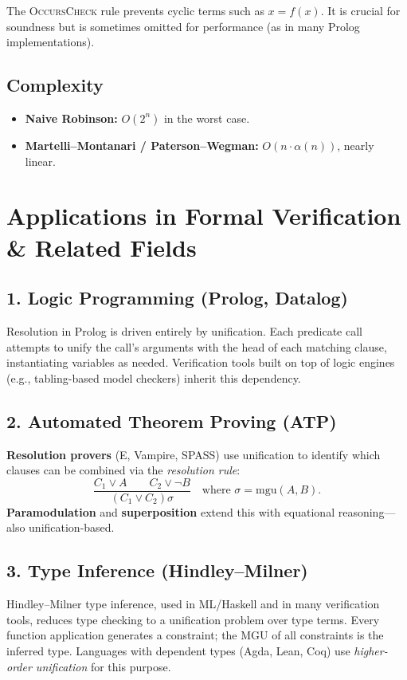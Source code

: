 \documentclass[11pt, a4paper]{article}
\begin{document}
\vspace{0.5em}
\noindent The \textsc{OccursCheck} rule prevents cyclic terms such as $x = f(x)$.
It is crucial for soundness but is sometimes omitted for performance (as in many
Prolog implementations).
 
\subsection{Complexity}
 
\begin{itemize}[leftmargin=*, itemsep=3pt]
    \item \textbf{Naive Robinson:} $O(2^n)$ in the worst case.
    \item \textbf{Martelli--Montanari / Paterson--Wegman:} $O(n \cdot \alpha(n))$, nearly linear.
\end{itemize}
 
\section{Applications in Formal Verification \& Related Fields}
 
\subsection{1. Logic Programming (Prolog, Datalog)}
Resolution in Prolog is driven entirely by unification. Each predicate call attempts
to unify the call's arguments with the head of each matching clause, instantiating
variables as needed. Verification tools built on top of logic engines (e.g.,
tabling-based model checkers) inherit this dependency.
 
\subsection{2. Automated Theorem Proving (ATP)}
\textbf{Resolution provers} (E, Vampire, SPASS) use unification to identify
which clauses can be combined via the \emph{resolution rule}:
\[
    \frac{C_1 \vee A \qquad C_2 \vee \neg B}
         {(C_1 \vee C_2)\sigma}
    \quad \text{where } \sigma = \mathrm{mgu}(A, B).
\]
\textbf{Paramodulation} and \textbf{superposition} extend this with equational
reasoning—also unification-based.
 
\subsection{3. Type Inference (Hindley--Milner)}
Hindley--Milner type inference, used in ML/Haskell and in many verification tools,
reduces type checking to a unification problem over type terms. Every function
application generates a constraint; the MGU of all constraints is the inferred type.
Languages with dependent types (Agda, Lean, Coq) use \emph{higher-order unification}
for this purpose.
 
\end{document}
